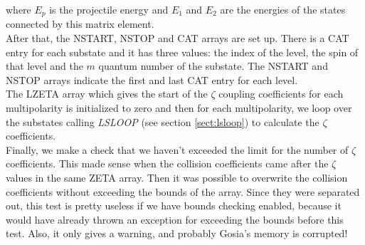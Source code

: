 \noindent where $E_p$ is the projectile energy and $E_1$ and $E_2$ are the
energies of the states connected by this matrix element.\\

\noindent After that, the NSTART, NSTOP and CAT arrays are set up. There is
a CAT entry for each substate and it has three values: the index of the
level, the spin of that level and the $m$ quantum number of the substate.
The NSTART and NSTOP arrays indicate the first and last CAT entry for each
level.\\

\noindent The LZETA array which gives the start of the $\zeta$ coupling
coefficients for each multipolarity is initialized to zero and then for each
multipolarity, we loop over the substates calling {\em LSLOOP} (see section
\ref{sect:lsloop}) to calculate the $\zeta$ coefficients.\\

\noindent Finally, we make a check that we haven't exceeded the limit for
the number of $\zeta$ coefficients. This made sense when the collision
coefficients came after the $\zeta$ values in the same ZETA array. Then it
was possible to overwrite the collision coefficients without exceeding the
bounds of the array. Since they were separated out, this test is pretty
useless if we have bounds checking enabled, because it would have already
thrown an exception for exceeding the bounds before this test. Also, it only
gives a warning, and probably Gosia's memory is corrupted!\\
